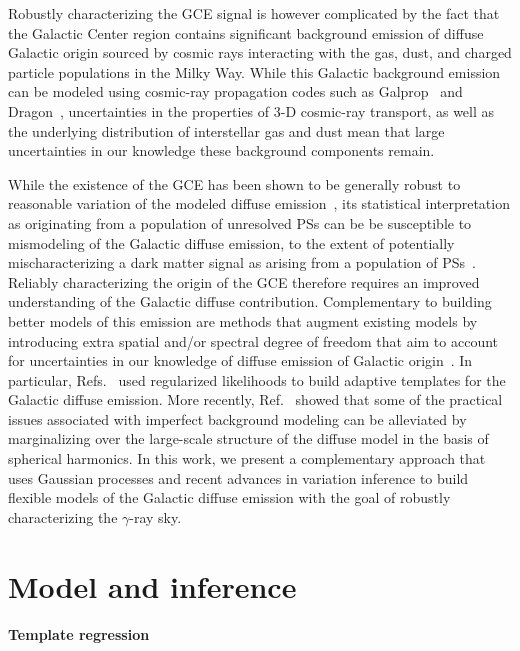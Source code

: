\documentclass[]{article}
\begin{document}
Robustly characterizing the GCE signal is however complicated by the fact that the Galactic Center region contains significant background emission of diffuse Galactic origin sourced by cosmic rays interacting with the gas, dust, and charged particle populations in the Milky Way. While this Galactic background emission can be modeled using cosmic-ray propagation codes such as Galprop~\cite{galprop,Strong:1999sv} and  Dragon~\cite{Evoli:2016xgn}, uncertainties in the properties of 3-D cosmic-ray transport, as well as the underlying distribution of interstellar gas and dust mean that large uncertainties in our knowledge these background components remain.

While the existence of the GCE has been shown to be generally robust to reasonable variation of the modeled diffuse emission~\cite{Daylan:2014rsa,Calore:2014xka,TheFermi-LAT:2015kwa,Linden:2016rcf}, its statistical interpretation as originating from a population of unresolved PSs can be be susceptible to mismodeling of the Galactic diffuse emission, to the extent of potentially mischaracterizing a dark matter signal as arising from a population of PSs~\cite{Lee:2015fea,Leane:2019uhc}. Reliably characterizing the origin of the GCE therefore requires an improved understanding of the Galactic diffuse contribution. Complementary to building better models of this emission are methods that augment existing models by introducing extra spatial and/or spectral degree of freedom that aim to account for uncertainties in our knowledge of diffuse emission of Galactic origin~\cite{Storm:2017arh,Bartels:2017vsx,Buschmann:2020adf,Chang:2018bpt}. In particular, Refs.~\cite{Storm:2017arh,Bartels:2017vsx} used regularized likelihoods to build adaptive templates for the Galactic diffuse emission. More recently, Ref.~\cite{Buschmann:2020adf} showed that some of the practical issues associated with imperfect background modeling can be alleviated by marginalizing over the large-scale structure of the diffuse model in the basis of spherical harmonics. In this work, we present a complementary approach that uses Gaussian processes and recent advances in variation inference to build flexible models of the Galactic diffuse emission with the goal of robustly characterizing the $\gamma$-ray sky.

\section{Model and inference}
\label{sec:model}

\paragraph{Template regression}
\end{document}
